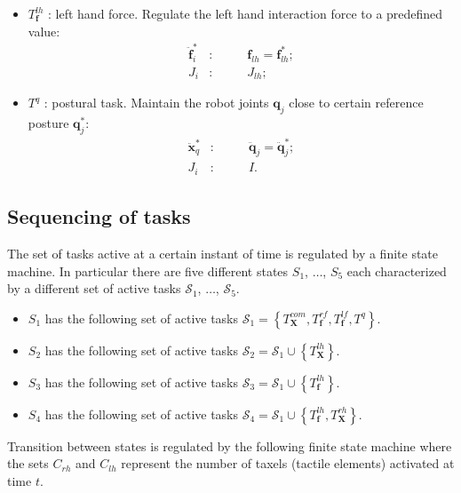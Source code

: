 \documentclass[12pt,a4paper,twoside]{article}
\begin{document}
\begin{itemize}
\item $T^{lh}_{\bm f}$ : left hand force. Regulate the left hand interaction force to a predefined value: 
\begin{eqnarray*}
\ddot {\bm f}^*_{i} &:& \qquad {\bm f}_{lh} = {\bm f}^*_{lh} ;\\
J_i &:& \qquad J_{lh};
\end{eqnarray*}

\item $T^q$ : postural task. Maintain the robot joints $\bm q_j$ close to certain reference posture $\bm q^*_j$:
\begin{eqnarray*} 
\ddot {\bm x}^*_{q} &:& \qquad \ddot {\bm q}_j = \ddot {\bm q}_j^*;\\
J_i &:& \qquad I.
\end{eqnarray*}

\end{itemize}


\subsection{Sequencing of tasks} \label{sec:taskSequencing}

The set of tasks active at a certain instant of time is regulated by a finite state machine. In particular there are five different states $S_1$, $\dots$, $S_5$ each characterized by a different set of active tasks $\mathcal S_1$, $\dots$, $\mathcal S_5$.

\begin{itemize}
\item $S_1$ has the following set of active tasks $\mathcal S_1 = \left\{ T^{com}_{\bm X}, T^{rf}_{\bm f}, T^{lf}_{\bm f}, T^q\right\}$.
\item $S_2$ has the following set of active tasks $\mathcal S_2 = \mathcal S_1 \cup \left\{  T^{lh}_{\bm X} \right\}$.
\item $S_3$ has the following set of active tasks $\mathcal S_3 = \mathcal S_1 \cup \left\{ T^{lh}_{\bm f} \right\}$.
\item $S_4$ has the following set of active tasks $\mathcal S_4 = \mathcal S_1 \cup \left\{  T^{lh}_{\bm f}, T^{rh}_{\bm X} \right\}$.
\end{itemize}

Transition between states is regulated by the following finite state machine where the sets $C_{rh}$ and $C_{lh}$ represent the number of taxels (tactile elements) activated at time $t$. 
\end{document}
